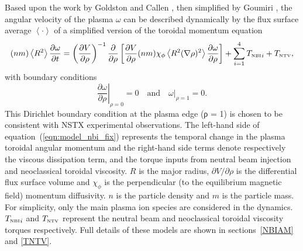 \documentclass[12pt,lot, lof]{puthesis}
\begin{document}
Based upon the work by Goldston \cite{Goldston86}  and Callen  \cite{Callen09}, then simplified by Goumiri \cite{Goumiri15}, the angular velocity of the plasma $\omega$ can be described dynamically by the flux surface average $\left<\cdot\right>$ of a simplified version of the toroidal momentum equation 
\begin{equation}
  (n m) \left<R^2\right>
 \frac{\partial \omega}{\partial t}
 = \left( \frac{\partial V}{\partial\rho}\right)^{-1}
   \frac{\partial}{\partial \rho} 
   \left[\frac{\partial V}{\partial \rho} (n m) \chi_\phi 
   \left< R^2 (\nabla \rho)^2\right> 
   \frac{\partial\omega}{\partial\rho}\right]
   + \sum _ {i=1}^{4}  {T_\textrm{\tiny NBI}}_i + T_\textrm{\tiny NTV}, 
\label{eqn:model_nbi_fix}
\end{equation}
with boundary conditions
\begin{equation}
\left.\frac{\partial\omega}{\partial\rho}\right|_{\rho=0} = 0 
\quad \text{and} \quad 
\left.\omega\right|_{\rho=1} = 0.
\label{bc0}
\end{equation}
This Dirichlet boundary condition at the plasma edge (ρ = 1) is chosen to be consistent with NSTX experimental observations.
The left-hand side of equation~(\ref{eqn:model_nbi_fix}) represents the temporal change in the plasma toroidal angular momentum and the right-hand side terms denote respectively the viscous dissipation term, and the torque inputs from neutral beam injection and neoclassical toroidal viscosity. $R$ is the major radius, $\partial V/\partial\rho$ is the differential flux surface volume and $\chi_\phi$ is the perpendicular (to the equilibrium magnetic field) momentum diffusivity. $n$ is the particle density and $m$ is the particle mass. For simplicity, only the main plasma ion species are considered in the dynamics.
${T_\textrm{\tiny NBI}}_i $ and $T_\textrm{\tiny NTV}$ represent the neutral beam and neoclassical toroidal viscosity torques respectively. Full details of these models are shown in sections~\ref{NBIAM} and \ref{TNTV}.
\end{document}
